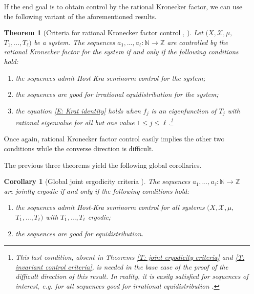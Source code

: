 \documentclass[11pt]{amsart}
\newtheorem{theorem}[lemma]{Theorem}
\newtheorem{corollary}[lemma]{Corollary}
\theoremstyle{definition}
\newcommand{\N}{{\mathbb N}}
\newcommand{\Z}{{\mathbb Z}}
\newcommand{\CX}{{\mathcal X}}
\newcommand{\1}{{\mathbf{1}}}
\begin{document}
If the end goal is to obtain control by the rational Kronecker factor, we can use the following variant of the aforementioned results.
\begin{theorem}[Criteria for rational Kronecker factor control {\cite[Theorem 1.6]{Fr21}, \cite[Theorem 2.6]{FrKu22a}}]\label{T: Krat control criteria}
        Let $(X, \CX, \mu,$\! $T_1, \ldots, T_\ell)$ be a system. The sequences $a_1,\ldots,a_\ell\colon \N\to \Z$ are controlled by the rational Kronecker factor for the system if and only if the following conditions hold:
        \begin{enumerate}
            \item the sequences admit Host-Kra seminorm control for the system;
            \item the sequences are good for irrational equidistribution for the system;
            \item the equation \eqref{E: Krat identity} holds when $f_j$ is an eigenfunction of $T_j$ with rational eigenvalue for all but one value $1\leq j\leq \ell$.\footnote{This last condition, absent in Theorems \ref{T: joint ergodicity criteria} and \ref{T: invariant control criteria}, is needed in the base case of the proof of the difficult direction of this result. In reality, it is easily satisfied for sequences of interest, e.g. for all sequences good for irrational equidistribution \cite[Lemma 5.3]{FrKu22a}.}
        \end{enumerate}
\end{theorem}
Once again, rational Kronecker factor control easily implies the other two conditions while the converse direction is difficult.

The previous three theorems yield the following global corollaries.
\begin{corollary}[Global joint ergodicity criteria {\cite[Theorem 2.1]{FrKu22a}}]\label{C: joint ergodicity criteria global}
    The sequences $a_1,\ldots,a_\ell\colon \N\to \Z$ are jointly ergodic if and only if the following conditions hold:
        \begin{enumerate}
            \item the sequences admit Host-Kra seminorm control for all systems $(X, \CX, \mu,$\! $T_1, \ldots, T_\ell)$ with $T_1, \ldots, T_\ell$ ergodic;
            \item the sequences are good for equidistribution.
        \end{enumerate}
\end{corollary}
\end{document}
